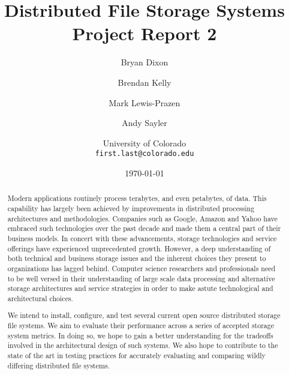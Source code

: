 \documentclass[11pt]{article}
\begin{document}
\title{
  Distributed File Storage Systems\\
  Project Report 2
}
\author{
  Bryan Dixon \and Brendan Kelly \and Mark Lewis-Prazen \and Andy Sayler\\
  \and University of Colorado\\
  \texttt{first.last@colorado.edu}
}
\date{\today}

\maketitle

\begin{abstract}
Modern applications routinely process terabytes, and even petabytes, 
of data. This capability has largely been achieved by improvements in 
distributed processing architectures and methodologies. Companies such 
as Google, Amazon and Yahoo have embraced such technologies over the 
past decade and made them a central part of their business models. In 
concert with these advancements, storage technologies and service 
offerings have experienced unprecedented growth. 
However, a deep understanding of both technical and business storage 
issues and the inherent choices they present to organizations has 
lagged behind. Computer science researchers and professionals 
need to be well versed in their understanding of large scale data 
processing and alternative storage architectures and service strategies 
in order to make astute technological and architectural choices. 

We intend to install, configure, and test several current 
open source distributed storage file systems. We aim to evaluate their 
performance across a series of accepted storage system metrics. In 
doing so, we hope to gain a better understanding for the tradeoffs 
involved in the architectural design of such systems. We also hope to
contribute to the state of the art in testing practices for accurately
evaluating and comparing wildly differing distributed file systems.

\end{abstract}

\newpage
\end{document}
